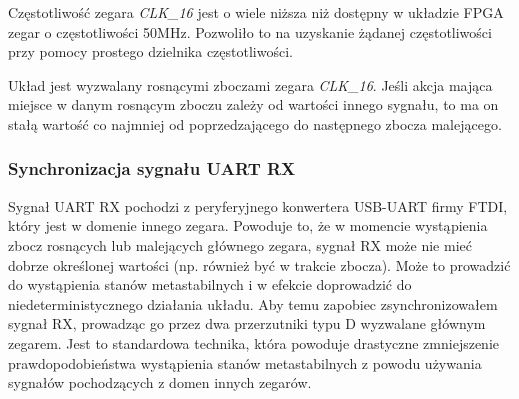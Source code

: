 Częstotliwość zegara \textit{CLK\_16} jest o wiele niższa niż dostępny w układzie FPGA zegar o częstotliwości 50MHz. Pozwoliło to na uzyskanie żądanej częstotliwości przy pomocy prostego dzielnika częstotliwości.

Układ jest wyzwalany rosnącymi zboczami zegara \textit{CLK\_16}. Jeśli akcja mająca miejsce w danym rosnącym zboczu zależy od wartości innego sygnału, to ma on stałą wartość co najmniej od poprzedzającego do następnego zbocza malejącego.


\subsubsection{Synchronizacja sygnału UART RX}
Sygnał UART RX pochodzi z peryferyjnego konwertera USB-UART firmy FTDI, który jest w domenie innego zegara. Powoduje to, że w momencie wystąpienia zbocz rosnących lub malejących głównego zegara, sygnał RX może nie mieć dobrze określonej wartości (np. również być w trakcie zbocza). Może to prowadzić do wystąpienia stanów metastabilnych \cite{altera-metastability} i w efekcie doprowadzić do niedeterministycznego działania układu. Aby temu zapobiec zsynchronizowałem sygnał RX, prowadząc go przez dwa przerzutniki typu D \cite{altera-metastability, 2ff-synchronization} wyzwalane głównym zegarem. Jest to standardowa technika, która powoduje drastyczne zmniejszenie prawdopodobieństwa wystąpienia stanów metastabilnych z powodu używania sygnałów pochodzących z domen innych zegarów.













\newpage